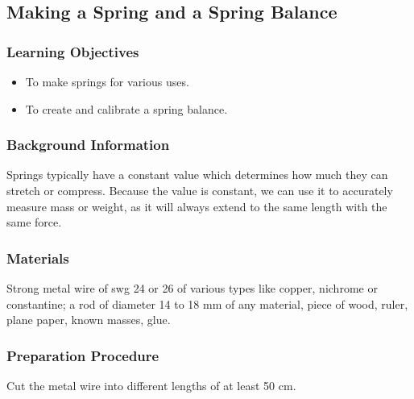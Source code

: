 \subsection{Making a Spring and a Spring Balance}

\subsubsection*{Learning Objectives}
\begin{itemize}
\item{To make springs for various uses.}
\item{To create and calibrate a spring balance.}
\end{itemize}

\subsubsection*{Background Information}
Springs typically have a constant value which determines how much they can stretch or compress.  Because the value is constant, we can use it to accurately measure mass or weight, as it will always extend to the same length with the same force.

\subsubsection*{Materials}
Strong metal wire of swg 24 or 26 of various types like copper, nichrome or constantine; a rod of diameter 14 to 18 mm of any material, piece of wood, ruler, plane paper, known masses, glue.

\subsubsection*{Preparation Procedure}
Cut the metal wire into different lengths of at least 50 cm.

